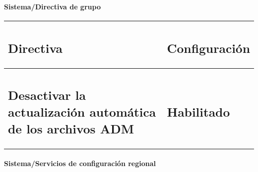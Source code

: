\documentclass[
]{article}
\begin{document}
\hypertarget{sistemadirectiva-de-grupo}{%
\paragraph{Sistema/Directiva de grupo}\label{sistemadirectiva-de-grupo}}

\begin{longtable}[]{@{}ll@{}}
\toprule
\begin{minipage}[b]{0.47\columnwidth}\raggedright
\hypertarget{directiva}{%
\subsection{Directiva}\label{directiva}}\strut
\end{minipage} & \begin{minipage}[b]{0.47\columnwidth}\raggedright
\hypertarget{configuraciuxf3n}{%
\subsection{\texorpdfstring{Configuración
}{Configuración }}\label{configuraciuxf3n}}\strut
\end{minipage}\tabularnewline
\midrule
\endhead
\begin{minipage}[t]{0.47\columnwidth}\raggedright
\hypertarget{desactivar-la-actualizaciuxf3n-automuxe1tica-de-los-archivos-adm}{%
\subsection{Desactivar la actualización automática de los archivos
ADM}\label{desactivar-la-actualizaciuxf3n-automuxe1tica-de-los-archivos-adm}}\strut
\end{minipage} & \begin{minipage}[t]{0.47\columnwidth}\raggedright
\hypertarget{habilitado-1}{%
\subsection{Habilitado}\label{habilitado-1}}\strut
\end{minipage}\tabularnewline
\bottomrule
\end{longtable}

\hypertarget{sistemaservicios-de-configuraciuxf3n-regional}{%
\paragraph{Sistema/Servicios de configuración
regional}\label{sistemaservicios-de-configuraciuxf3n-regional}}
\end{document}
